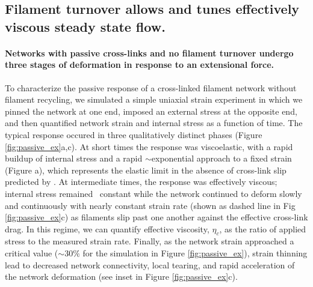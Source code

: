 \documentclass[10pt,letterpaper]{article}
\begin{document}
\subsection*{Filament turnover allows and tunes effectively viscous steady state flow.}
 
\paragraph{Networks with passive cross-links and no filament turnover undergo three stages of deformation in response to an extensional force.} 

To characterize the passive response of a cross-linked filament network without filament recycling, we simulated a simple uniaxial strain experiment in which we pinned the network at one end, imposed an external stress at the opposite end, and then quantified network strain and internal stress as a function of time. The typical response occured in three qualitatively distinct phases (Figure \ref{fig:passive_ex}a,c). At short times the response was viscoelastic, with a rapid buildup of internal stress and a rapid $\sim$exponential approach to a fixed strain (Figure a), which represents the elastic limit in the absence of cross-link slip predicted by \cite{theo_hlm}. At intermediate times, the response was effectively viscous; internal stress remained ~constant while the network continued to deform slowly and continuously with nearly constant strain rate (shown as dashed line in Fig \ref{fig:passive_ex}c) as filaments slip past one another against the effective cross-link drag. In this regime, we can quantify effective viscosity, $\eta_c$,  as the ratio of applied stress to the measured strain rate. Finally, as the network strain approached a critical value ($\sim 30\%$ for the simulation in Figure \ref{fig:passive_ex}), strain thinning lead to decreased network connectivity, local tearing, and rapid acceleration of the network deformation (see inset in Figure \ref{fig:passive_ex}c).
\end{document}
